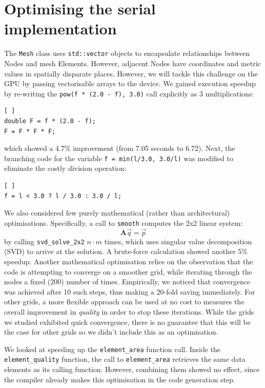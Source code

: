 \documentclass[a4paper,11pt, twocolumn]{article}
\begin{document}
\section{Optimising the serial implementation}
The \verb+Mesh+ class uses \verb+std::vector+ objects to encapsulate relationships between Nodes and mesh Elements.
However, adjacent Nodes have coordinates and metric values in spatially disparate places.
However, we will tackle this challenge on the GPU by passing vectorisable arrays to the device.
We gained execution speedup by re-writing the \verb+pow(f * (2.0 - f), 3.0)+ call explicitly as 3 multiplications:
\begin{lstlisting}[ ]
double F = f * (2.0 - f);
F = F * F * F;
\end{lstlisting}
which showed a 4.7\% improvement (from 7.05 seconds to 6.72).
Next, the branching code for the variable \verb+f = min(l/3.0, 3.0/l)+ was modified to eliminate the costly division operation:
\begin{lstlisting}[ ]
f = l < 3.0 ? l / 3.0 : 3.0 / l;
\end{lstlisting}
We also considered few purely mathematical (rather than architectural) optimisations.
Specifically, a call to \verb+smooth+ computes the 2x2 linear system:
\[
\mathbf{A}\vec{q} = \vec{p}
\]
by calling \verb+svd_solve_2x2+ $n \cdot m$ times, which uses singular value decomposition (SVD) to arrive at the solution.
A brute-force calculation showed another 5\% speedup.
Another mathematical optimisation relies on the observation that the code is attempting to converge on a smoother grid, while iterating through the nodes a fixed (200) number of times.
Empirically, we noticed that convergence was achieved after 10 such steps, thus making a 20-fold saving immediately.
For other grids, a more flexible approach can be used at no cost to measures the overall improvement in \emph{quality} in order to stop these iterations.
While the grids we studied exhibited quick convergence, there is no guarantee that this will be the case for other grids so we didn't include this as an optimisation.

We looked at speeding up the \verb+element_area+ function call.
Inside the \verb+element_quality+ function, the call to \verb+element_area+ retrieves the same data elements as its calling function.
However, combining them showed no effect, since the compiler already makes this optimisation in the code generation step.
\end{document}
